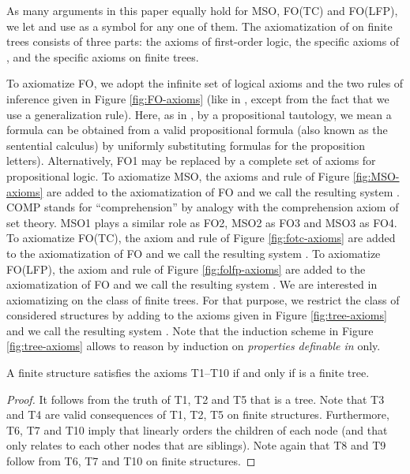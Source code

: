 \documentclass{LMCS}
\newcommand{\fo}{\textsf{FO}\xspace}
\newcommand{\mso}{\textsf{MSO}\xspace}
\newcommand{\fotc}{\textsf{FO(TC)}\xspace}
\newcommand{\folfp}{\textsf{FO(LFP)}\xspace}
\begin{document}
As many arguments in this paper equally hold for \mso, \fotc and
\folfp, we let  and use
 as a symbol for any one of them. The axiomatization of
 on finite trees consists of three parts: the axioms of
first-order logic, the specific axioms of , and the
specific axioms on finite trees.


To axiomatize \fo, we adopt the infinite set of
logical axioms and the two rules of inference given in Figure
\ref{fig:FO-axioms} (like in \cite{Enderton}, except from the fact
that we use a generalization rule). Here, as in \cite{Enderton}, by a 
propositional tautology, we mean a formula can be obtained
from a valid propositional formula (also known as the 
sentential calculus) by uniformly substituting formulas for the 
proposition letters). Alternatively, FO1 may be replaced by a 
complete set of axioms for propositional logic.
To axiomatize \mso, the
axioms and rule of Figure \ref{fig:MSO-axioms} are added to the
axiomatization of \fo and we call the resulting system .
COMP stands for ``comprehension'' by analogy with the
comprehension axiom of set theory. MSO1 plays a similar role as
FO2, MSO2 as FO3 and MSO3 as FO4. To axiomatize \fotc,
the axiom and rule of Figure \ref{fig:fotc-axioms} are added to
the axiomatization of \fo and we call the resulting system
. To axiomatize \folfp, the axiom and rule of Figure
\ref{fig:folfp-axioms} are added to the axiomatization of \fo and we
call the resulting system . We are interested in
axiomatizing  on the class of finite trees. For that
purpose, we restrict the class of considered structures by adding
to  the axioms given in Figure
\ref{fig:tree-axioms} and we call the resulting system
. Note that the induction scheme in Figure
\ref{fig:tree-axioms} allows to reason by induction on \emph{properties definable in } only.

\begin{prop}\label{prop:define-finite}
A finite structure  satisfies the axioms T1--T10 if and only
if  is a finite tree.
\end{prop}

\begin{proof}
  It follows from the truth of T1, T2 and T5 that  is a tree.
  Note that T3 and T4 are valid consequences of T1, T2, T5 on finite
  structures.  Furthermore, T6, T7 and T10 imply that 
  linearly orders the children of each node (and that  only
  relates to each other nodes that are siblings). Note again that
  T8 and T9 follow from T6, T7 and T10 on finite structures.
\end{proof}
\end{document}
